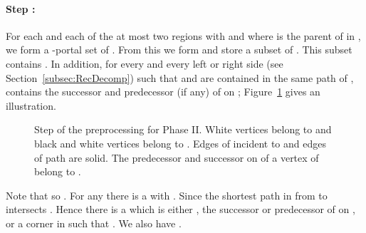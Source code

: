 \documentclass[11pt]{article}
\begin{document}
\paragraph{Step :} For each  and each of the at most two regions  with  and  where  is the parent of  in , we form a -portal set  of . From this we form and store a subset  of . This subset contains . In addition, for every  and every left or right side  (see Section~\ref{subsec:RecDecomp}) such that  and  are contained in the same path of ,  contains the successor and predecessor (if any) of  on ; Figure~\ref{fig:Pw} gives an illustration.
\begin{figure}\centerline{}
\caption{Step  of the preprocessing for Phase II. White vertices belong to  and black and white vertices belong to . Edges of  incident to  and edges of path  are solid. The predecessor and successor on  of a vertex of  belong to .}
\label{fig:Pw}
\end{figure}
Note that  so . For any  there is a  with . Since  the shortest path in  from  to  intersects . Hence there is a  which is either , the successor or predecessor of  on , or a corner in  such that . We also have .
\end{document}
